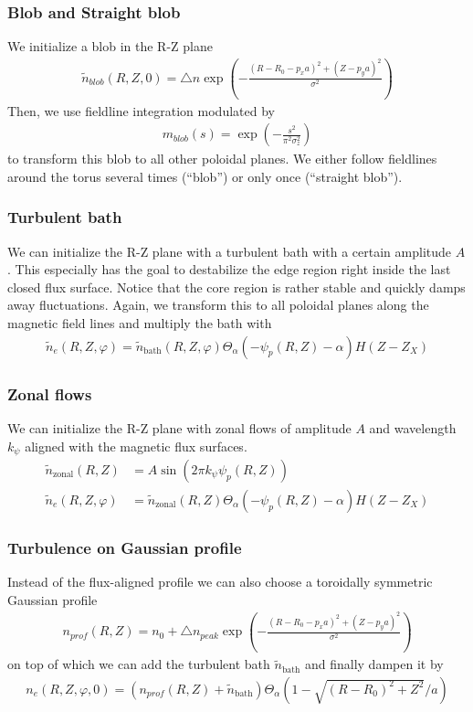 \subsubsection{Blob and Straight blob}
We initialize a blob in the R-Z plane
\begin{align} \label{eq:initial_blob}
  \tilde n_{blob}(R,Z,0) = \triangle n \exp\left( -\frac{(R - R_0 - p_x a)^2 + (Z-p_ya)^2}{\sigma^2} \right)
\end{align}
Then, we use fieldline integration modulated by 
\begin{align}
  m_{blob}(s) = \exp\left( -\frac{s^2 }{\pi^2\sigma_z^2} \right)
\end{align}
to transform this blob to all other poloidal
planes.
We either follow fieldlines around the torus several times (``blob'') or only once
(``straight blob'').
\subsubsection{Turbulent bath}
We can initialize the R-Z plane with a turbulent bath with a certain amplitude $A$.
This especially has the goal to destabilize the edge region right inside the
last closed flux surface. Notice that the core region is rather stable
and quickly damps away fluctuations.
Again, we transform this to all poloidal planes along the magnetic field lines and multiply the bath with
\begin{align} \label{eq:initial_turbulent}
\tilde n_e(R,Z,\varphi) = \tilde n_{\text{bath}}(R,Z,\varphi)\Theta_{\alpha}(-\psi_p(R, Z)-\alpha) H(Z-Z_X)
\end{align}
\subsubsection{Zonal flows}
We can initialize the R-Z plane with zonal flows of amplitude $A$ and
wavelength $k_\psi$ aligned with the magnetic flux surfaces.
\begin{align} \label{eq:initial_zonal_flow}
    \tilde n_{\text{zonal}}(R,Z) &= A \sin (2\pi k_\psi \psi_p(R,Z)) \nonumber\\
\tilde n_e(R,Z,\varphi) &= \tilde n_{\text{zonal}}(R,Z)\Theta_{\alpha}(-\psi_p(R, Z)-\alpha) H(Z-Z_X)
\end{align}
\subsubsection{Turbulence on Gaussian profile}
Instead of the flux-aligned profile we can also choose a toroidally symmetric Gaussian profile
\begin{align} \label{eq:profile_blob}
  n_{prof}(R,Z) = n_0 + \triangle n_{peak} \exp\left( -\frac{(R - R_0 - p_x a)^2 + (Z-p_ya)^2}{\sigma^2} \right)
\end{align}
on top of which we can add the turbulent bath $\tilde n_{\text{bath}}$ and finally dampen it by
\begin{align}\label{eq:turbulence_on_gaussian}
n_e(R,Z,\varphi,0) = (n_{prof}(R,Z) + \tilde n_{\text{bath}})\Theta_\alpha( 1- \sqrt{(R-R_0)^2 + Z^2}/a)
\end{align}


